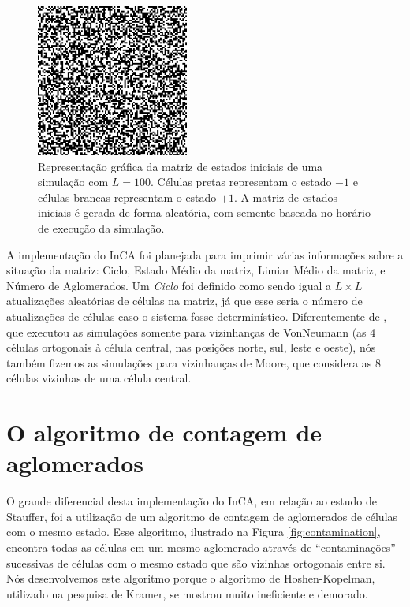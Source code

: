 \documentclass[
	12pt,				%
	openright,			%
	twoside,			%
	a4paper,			%
	english,			%
	french,				%
	spanish,			%
	brazil				%
	]{abntex2}
\begin{document}
\begin{figure}
    \centering
    \includegraphics[width=5cm]{matrizL100Ciclo0.png}
    \caption{Representação gráfica da matriz de estados iniciais de uma simulação com $L=100$. Células pretas representam o estado $-1$ e células brancas representam o estado $+1$. A matriz de estados iniciais é gerada de forma aleatória, com semente baseada no horário de execução da simulação.}
    \label{fig:matrizL100Ciclo0}
\end{figure}

A implementação do InCA foi planejada para imprimir várias informações sobre a situação da matriz: Ciclo, Estado Médio da matriz, Limiar Médio da matriz, e Número de Aglomerados. Um \textit{Ciclo} foi definido como sendo igual a $L\times L$ atualizações aleatórias de células na matriz, já que esse seria o número de atualizações de células caso o sistema fosse determinístico. Diferentemente de \cite{stauffer}, que executou as simulações somente para vizinhanças de VonNeumann (as 4 células ortogonais à célula central, nas posições norte, sul, leste e oeste), nós também fizemos as simulações para vizinhanças de Moore, que considera as 8 células vizinhas de uma célula central.

\section{O algoritmo de contagem de aglomerados}

O grande diferencial desta implementação do InCA, em relação ao estudo de Stauffer, foi a utilização de um algoritmo de contagem de aglomerados de células com o mesmo estado. Esse algoritmo, ilustrado na Figura \ref{fig:contamination}, encontra todas as células em um mesmo aglomerado através de ``contaminações'' sucessivas de células com o mesmo estado que são vizinhas ortogonais entre si. Nós desenvolvemos este algoritmo porque o algoritmo de Hoshen-Kopelman, utilizado na pesquisa de Kramer, se mostrou muito ineficiente e demorado.
\end{document}
